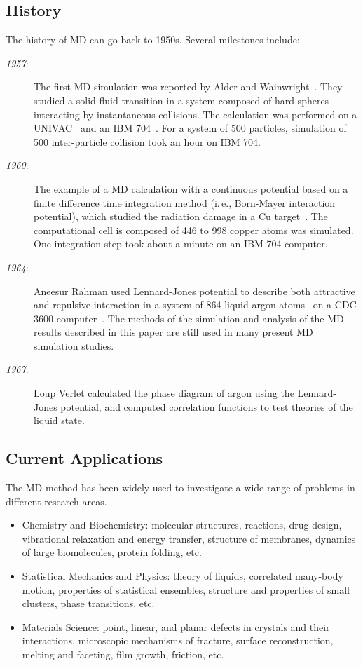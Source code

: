\documentclass[a4paper,10pt,technote,compsoc,onecolumn]{IEEEtran}
\newcommand{\ie}{i.\,e., }
\numberwithin{equation}{section}
\begin{document}
\subsection{History}
The history of \ac{MD} can go back to 1950s. Several milestones include:
\begin{description}
  \item [{\em 1957}:] The first \ac{MD} simulation was reported by Alder and
  Wainwright~\cite{alder57jcs}. They studied a solid-fluid transition in a
  system composed of hard spheres interacting by instantaneous collisions. The
  calculation was performed on a UNIVAC~\cite{univac} and an IBM
  704~\cite{ibm704}. For a system of 500 particles, simulation of 500
  inter-particle collision took an hour on IBM 704.

  \item [{\em 1960}:] The example of a \ac{MD} calculation with a continuous
  potential based on a finite difference time integration method (\ie
  Born-Mayer interaction potential), which studied the radiation damage in a 
  Cu target~\cite{gibson60phyrev}. The computational cell is composed of 446 
  to 998 copper atoms was simulated. One integration step took about a minute
  on an IBM 704 computer.

  \item [{\em 1964}:] Aneesur Rahman used Lennard-Jones potential to describe
  both attractive and repulsive interaction in a system of 864 liquid argon
  atoms~\cite{rahman64phyrev} on a CDC 3600 computer~\cite{cdc3600}. The
  methods of the simulation and analysis of the \ac{MD} results described in
  this paper are still used in many present \ac{MD} simulation studies.

  \item [{\em 1967}:] Loup Verlet calculated the phase diagram of argon using
  the Lennard-Jones potential, and computed correlation functions to test
  theories of the liquid state.
\end{description}

\subsection{Current Applications}
The MD method has been widely used to investigate a wide range of problems in
different research areas.
\begin{itemize}
  \item Chemistry and Biochemistry: molecular structures, reactions, drug
  design, vibrational relaxation and energy transfer, structure of membranes,
  dynamics of large biomolecules, protein folding, etc.

  \item Statistical Mechanics and Physics: theory of liquids, correlated
  many-body motion, properties of statistical ensembles, structure and
  properties of small clusters, phase transitions, etc.

  \item Materials Science: point, linear, and planar defects in crystals and
  their interactions, microscopic mechanisms of fracture, surface
  reconstruction, melting and faceting, film growth, friction, etc.
\end{itemize}
\end{document}
